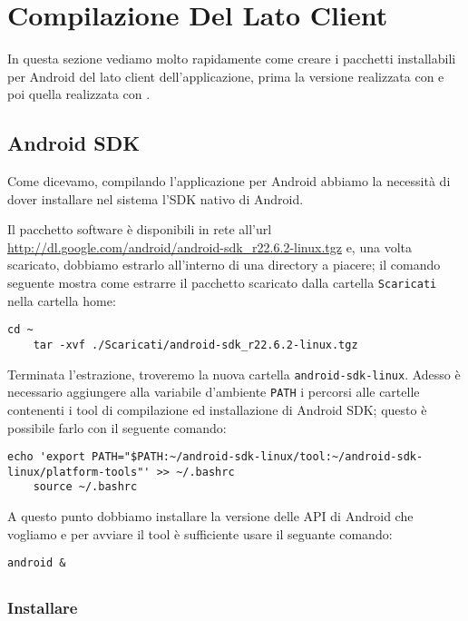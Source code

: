 \chapter{Compilazione Del Lato Client}

In questa sezione vediamo molto rapidamente come creare i pacchetti installabili
per Android del lato client dell'applicazione, prima la versione realizzata con
\pg{} e poi quella realizzata con \tisdk{}.

\section{Android SDK}
    Come dicevamo, compilando l'applicazione per Android abbiamo la necessità di
    dover installare nel sistema l'SDK nativo di Android.
    
    Il pacchetto software è disponibili in rete all'url
    \url{http://dl.google.com/android/android-sdk_r22.6.2-linux.tgz} e, una
    volta scaricato, dobbiamo estrarlo all'interno di una directory a piacere;
    il comando seguente mostra come estrarre il pacchetto scaricato dalla 
    cartella \texttt{Scaricati} nella cartella home:
    \begin{lstlisting}[language=plane]
    cd ~
    tar -xvf ./Scaricati/android-sdk_r22.6.2-linux.tgz
    \end{lstlisting}
    Terminata l'estrazione, troveremo la nuova cartella
    \texttt{android-sdk-linux}. Adesso è necessario aggiungere alla 
    variabile d'ambiente \texttt{PATH} i percorsi alle cartelle contenenti i 
    tool di compilazione ed installazione di Android SDK; questo è possibile 
    farlo con il seguente comando:
    \begin{lstlisting}[language=plane]
    echo 'export PATH="$PATH:~/android-sdk-linux/tool:~/android-sdk-linux/platform-tools"' >> ~/.bashrc
    source ~/.bashrc
    \end{lstlisting}
    A questo punto dobbiamo installare la versione delle API di Android che 
    vogliamo e per avviare il tool è sufficiente usare il seguante comando:
    \begin{lstlisting}[language=plane]
    android &
    \end{lstlisting}
    
    
\section{\pg{}}

    \subsection{Installare \pg{}}

